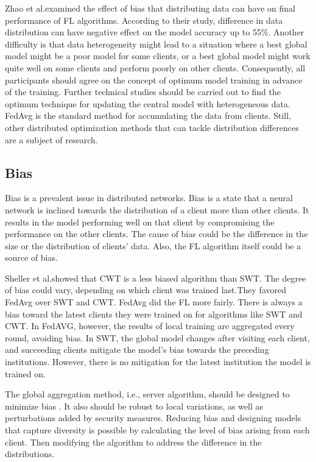 Zhao et al.\cite{zhao2018federated}examined the effect of bias that distributing data can have on final performance of FL algorithms. According to their study, difference in data distribution can have negative effect on the model accuracy up to 55\%. Another difficulty is that data heterogeneity might lead to a situation where a best global model might be a poor model for some clients, or a best global model might work quite well on some clients and perform poorly on other clients. Consequently, all participants should agree on the concept of optimum model training in advance of the training. Further technical studies should be carried out to find the optimum technique for updating the central model with heterogeneous data. FedAvg is the standard method for accumulating the data from clients. Still, other distributed optimization methods that can tackle distribution differences are a subject of research.



\subsection{Bias}
Bias is a prevalent issue in distributed networks. Bias is a state that a neural network is inclined towards the distribution of a client more than other clients. It results in the model performing well on that client by compromising the performance on the other clients. The cause of bias could be the difference in the size or the distribution of clients' data. Also, the FL algorithm itself could be a source of bias.


Sheller et al.\cite{sheller2020federated}showed that CWT is a less biased algorithm than SWT. The degree of bias could vary, depending on which client was trained last.They favored FedAvg over SWT and CWT. FedAvg did the FL more fairly.  There is always a bias toward the latest clients they were trained on for algorithms like SWT and CWT. In FedAVG, however, the results of local training are aggregated every round, avoiding bias. In SWT, the global model changes after visiting each client, and succeeding clients mitigate the model's bias towards the preceding institutions. However, there is no mitigation for the latest institution the model is trained on.





The global aggregation method, i.e., server algorithm, should be designed to minimize bias . It also should be robust to local variations, as well as perturbations added by security measures. Reducing bias and designing models that capture diversity is possible by calculating the level of bias arising from each client. Then modifying the  algorithm to address the difference in the distributions. 


